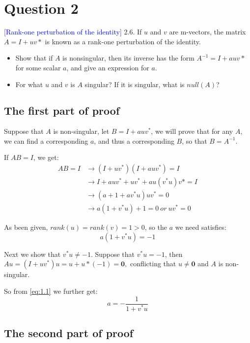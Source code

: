 \section*{Question 2}
\textcolor{blue}{[Rank-one perturbation of the identity]}
2.6. If $u$ and $v$ are m-vectors, 
the matrix $A = I + uv*$ is known as a rank-one perturbation of the identity. 
\begin{itemize}
    \item Show that if $A$ is nonsingular, then its inverse has the form $A^{-1} = I + auv*$ for some scalar $a$, and give an expression for $a$.
    \item For what $u$ and $v$ is $A$ singular? If it is singular, what is $null (A)$?
\end{itemize}



\subsection*{The first part of proof}
Suppose that $A$ is non-singular, 
let $B = I + auv^*$, we will prove that for any $A$,
we can find a corresponding $a$, and thus a corresponding $B$,
so that $B = A^{-1}$.

If $AB = I$, we get:
\begin{align*}
    AB = I &\rightarrow (I + uv^*)(I + auv^*) = I\\
           &\rightarrow I + auv^* + uv^* + au(v^*u)v* = I \\
           &\rightarrow (a + 1 + av^*u)uv^* = 0 \\
           &\rightarrow a(1 + v^*u) + 1 = 0 \ or\ uv^* = 0
\end{align*}

As been given,  $rank(u) = rank(v) = 1 > 0$,
so the $a$ we need satisfies:
\begin{equation}
    \label{eq:1.1}
    a(1 + v^*u) = -1
\end{equation}

Next we show that $v^*u \neq -1$. Suppose that $v^*u = -1$, then 
$Au = (I + uv^*)u = u + u*(-1) =  \mathbf{0}, $ conflicting that
$u\neq \mathbf{0}$ and $A$ is non-singular.

So from \eqref{eq:1.1} we further get:
\begin{equation}
a = - \dfrac{1}{1+v^*u}
\end{equation}

\subsection*{The second part of proof}

